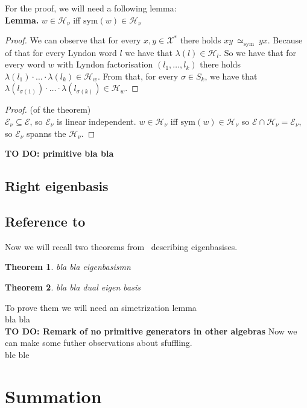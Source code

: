 \documentclass[a4paper, 12pt]{report}
\newtheorem{theorem}{Theorem}
\newcommand{\todo}[1]{\hfill \break \textbf{\Huge TO DO: #1 \hfill \break}\normalsize}
\newcommand{\SimeqSym}{{\simeq_\mathrm{sym}}}
\begin{document}
For the proof, we will need a following lemma: \\
\noindent \textbf{Lemma.} $w \in \mathcal{H}_\nu$ iff $\mathrm{sym}(w) \in \mathcal{H}_\nu$
\begin{proof}
We can observe that for every $x, y \in \mathcal{X}^*$ there holds $xy\ \SimeqSym\ yx$. Because of that
for every Lyndon word $l$ we have that $\lambda(l) \in \mathcal{H}_l$. So we have that for every word $w$
with Lyndon factorisation $(l_1,\dots, l_k)$ there holds
$\lambda(l_1)\cdot\ldots\cdot\lambda(l_k) \in \mathcal{H}_w$. From that, for every
$\sigma \in S_k$, we have that $\lambda(l_{\sigma(1)})\cdot\ldots\cdot\lambda(l_{\sigma(k)}) \in
\mathcal{H}_w$.

\end{proof}
\begin{proof}(of the theorem) \\
$\mathcal{E}_\nu \subseteq\mathcal{E}$,
so $\mathcal{E}_\nu$ is linear independent. $w \in \mathcal{H}_\nu$ iff
$\mathrm{sym}(w) \in \mathcal{H}_\nu$ so $\mathcal{E} \cap \mathcal{H}_\nu = \mathcal{E}_\nu$, so
$\mathcal{E}_\nu$ spanns the $\mathcal{H}_\nu$.
\end{proof}


\todo{primitive bla bla}
\section{Right eigenbasis}

\section{Reference to~\cite{Diaconis2014}}
Now we will recall two theorems from~\cite{Diaconis2014} describing eigenbasises.
\begin{theorem}
bla bla eigenbasismn
\end{theorem}
\begin{theorem}
bla bla dual eigen basis
\end{theorem}
To prove them we will need an simetrization lemma \\
bla bla\\[8pt]
\todo{Remark of no primitive generators in other algebras}
Now we can make some futher observations about sfuffling.\\
ble ble\\

\chapter{Summation}


{}

\end{document}
